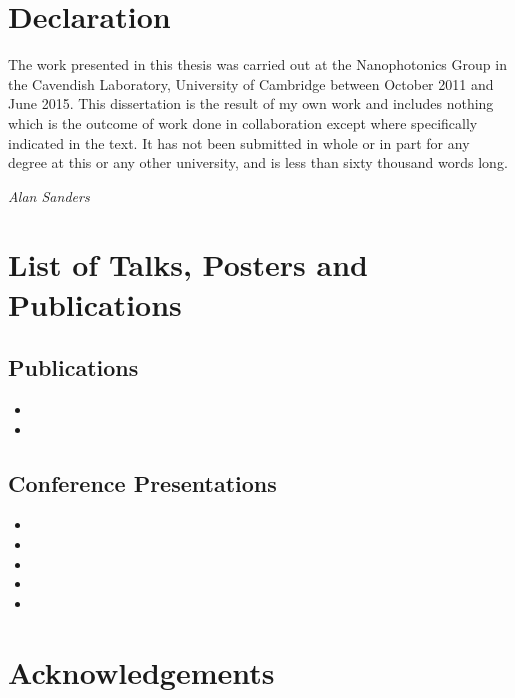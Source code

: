 \documentclass[12pt, a4paper, oneside]{book}
\begin{document}

\section*{Declaration}
The work presented in this thesis was carried out at the Nanophotonics Group in the Cavendish Laboratory, University of Cambridge between October 2011 and June 2015. This dissertation is the result of my own work and includes nothing which is the outcome of work done in collaboration except where specifically indicated in the text. It has not been submitted in whole or in part for any degree at this or any other university, and is less than sixty thousand words long.

{\flushright\emph{Alan Sanders}\par}

\section*{List of Talks, Posters and Publications}
\subsection*{Publications}
\begin{itemize}
\item {}
\item {}
\end{itemize}

\subsection*{Conference Presentations}
\begin{itemize}
\item {}
\item {}
\item {}
\item {}
\item {}
\end{itemize}

\newpage
\section*{Acknowledgements}
\end{document}
